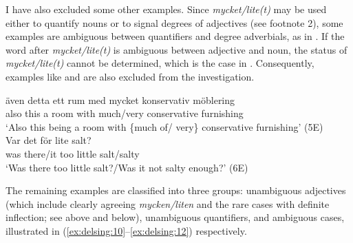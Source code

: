 \documentclass[output=paper]{langscibook}
\begin{document}
I have also excluded some other examples. Since \textit{mycket/lite(t)} may be used either to quantify nouns or to signal degrees of adjectives (see footnote 2), some examples are ambiguous between quantifiers and degree adverbials, as in . If the word after \textit{mycket/lite(t)} is ambiguous between adjective and noun, the status of \textit{mycket/lite(t)} cannot be determined, which is the case in . Consequently, examples like  and  are also excluded from the investigation.


\ea\label{ex:delsing:8}
\gll även    detta  ett  rum    med    mycket    konservativ    möblering \\
also      this      a    room  with  much/very  conservative    furnishing\\
\glt `Also this being a room with \{much of/ very\} conservative furnishing’ (5E)\\
\ex\label{ex:delsing:9}
\gll Var    det         för   lite     salt?\\
was     there/it       too     little   salt/salty\\
\glt ‘Was there too little salt?\slash Was it not salty enough?’ (6E)
\z



The remaining examples are classified into three groups: unambiguous adjectives (which include clearly agreeing \textit{mycken/liten} and the rare cases with definite inflection; see  above and  below), unambiguous quantifiers, and ambiguous cases, illustrated in (\ref{ex:delsing:10}--\ref{ex:delsing:12}) respectively.
\end{document}

